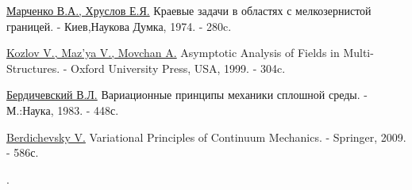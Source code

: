 \documentclass[12pt,a4paper]{article}
\begin{document}
\begin{thebibliography}{00}
\href{Books/Marchenko - 1974.djvu}{Марченко В.А., Хруслов Е.Я.} Краевые задачи в областях с мелкозернистой границей. - 	Киев,Наукова Думка, 1974. - 280c.

\href{Books/Kozlov - Asymptotic Analysis of Fields in Multi-Structures 1999.djvu}{Kozlov V., Maz'ya V., Movchan A.} Asymptotic Analysis of Fields in Multi-Structures. - 	Oxford University Press, USA, 1999. - 304c.

\href{Books/Russian/Berdichevsky _Variacionnuee_principue_mehaniki sploshnoi sredi 1983.djvu}{Бердичевский В.Л.} Вариационные принципы механики сплошной среды. - М.:Наука, 1983. - 448с.

\href{Books/Berdichevsky Variational_Principles_of_Continuum Mechanics 2009.pdf}{Berdichevsky V.} Variational Principles of Continuum Mechanics. - Springer, 2009. - 586с.

.
\end{thebibliography}
\end{document}

